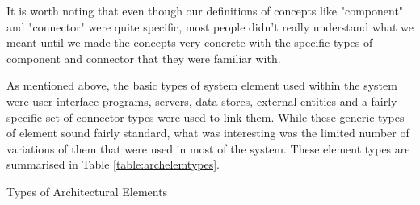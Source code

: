   It is worth noting that even though our definitions of concepts like "component" and "connector" were quite specific, most people didn't really understand what we meant until we made the concepts very concrete with the specific types of component and connector that they were familiar with.

  As mentioned above, the basic types of system element used within the system were user interface programs, servers, data stores, external entities and a fairly specific set of connector types were used to link them.  While these generic types of element sound fairly standard, what was interesting was the limited number of variations of them that were used in most of the system.  These element types are summarised in Table \ref{table:archelemtypes}.

  
\begin{table}
\caption{Types of Architectural Elements}
\label{table:archelemtypes}
\footnotesize


\end{table}
